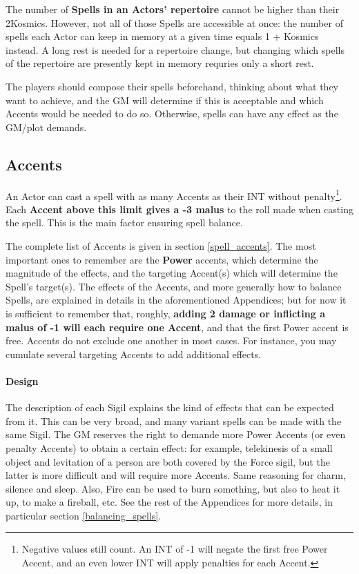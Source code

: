 The number of \textbf{Spells in an Actors' repertoire} cannot be higher than their 2\texttimes Kosmics. However, not all of those Spells are accessible at once: the number of spells each Actor can keep in memory at a given time equals 1 + Kosmics instead. A long rest is needed for a repertoire change, but changing which spells of the repertoire are presently kept in memory requries only a short rest.

The players should compose their spells beforehand, thinking about what they want to achieve, and the GM will determine if this is acceptable and which Accents would be needed to do so. Otherwise, spells can have any effect as the GM/plot demands.


\subsection{Accents}

An Actor can cast a spell with as many Accents as their INT without penalty\footnote{Negative values still count. An INT of -1 will negate the first free Power Accent, and an even lower INT will apply penalties for each Accent.}. Each \textbf{Accent above this limit gives a -3 malus} to the roll made when casting the spell. This is the main factor ensuring spell balance.

The complete list of Accents is given in section \ref{spell_accents}. The most important ones to remember are the \textbf{Power} accents, which determine the magnitude of the effects, and the targeting Accent(s) which will determine the Spell's target(s). The effects of the Accents, and more generally how to balance Spells, are explained in details in the aforementioned Appendices; but for now it is sufficient to remember that, roughly, \textbf{adding 2 damage or inflicting a malus of -1 will each require one Accent}, and that the first Power accent is free. Accents do not exclude one another in most cases. For instance, you may cumulate several targeting Accents to add additional effects. 

\paragraph{Design}

The description of each Sigil explains the kind of effects that can be expected from it. This can be very broad, and many variant spells can be made with the same Sigil. The GM reserves the right to demande more Power Accents (or even penalty Accents) to obtain a certain effect: for example, telekinesis of a small object and levitation of a person are both covered by the Force sigil, but the latter is more difficult and will require more Accents. Same reasoning for charm, silence and sleep. Also, Fire can be used to burn something, but also to heat it up, to make a fireball, etc. See the rest of the Appendices for more details, in particular section \ref{balancing_spells}.

